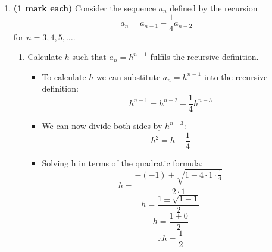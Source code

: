 \documentclass[12pt]{report}
\begin{document}
\begin{enumerate}[leftmargin=\labelsep]
\newpage

    \item {\bf (1 mark each)} Consider the sequence $a_n$ defined by the recursion
        \begin{equation}
            a_n=a_{n-1}-\frac{1}{4}a_{n-2}
        \end{equation} for $n=3,4,5,\dots$.
        \begin{enumerate}
            \item Calculate $h$ such that $a_n=h^{n-1}$ fulfils the recursive definition.
                \begin{tcolorbox}
                    \begin{itemize}[label={}]
                        \item To calculate $h$ we can substitute $a_n=h^{n-1}$ into the recursive definition:
                        \begin{equation*}
                            h^{n-1}=h^{n-2}-\frac{1}{4}h^{n-3}
                        \end{equation*}
                        \item We can now divide both sides by $h^{n-3}$:
                        \begin{equation*}
                            h^2=h- \frac{1}{4}
                        \end{equation*}
                        \item Solving h in terms of the quadratic formula:
                        \begin{equation*}
                            h=\frac{-(-1) \pm \sqrt{1-4 \cdot 1 \cdot \frac{1}{4}}}{2 \cdot 1}
                        \end{equation*}
                        \begin{equation*}
                            h=\frac{1 \pm \sqrt{1-1}}{2}
                        \end{equation*}
                        \begin{equation*}
                            h=\frac{1 \pm 0}{2}
                        \end{equation*}
                        \begin{equation*}
                            \therefore h=\frac{1}{2}
                        \end{equation*}
                    \end{itemize}
                \end{tcolorbox}

\end{enumerate}
\end{enumerate}
\end{document}
